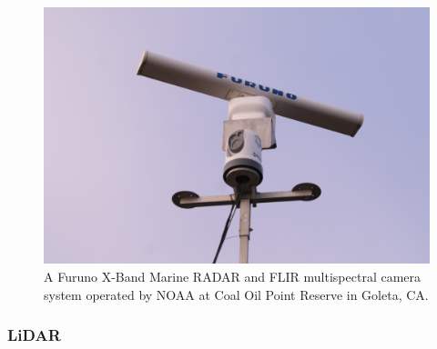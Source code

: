 \documentclass{article}
\begin{document}
\begin{figure}
    \centering
    \includegraphics[width=1\linewidth]{images/furuno-x-band-radar.JPG}
    \caption{A Furuno X-Band Marine RADAR and FLIR multispectral camera system operated by NOAA at Coal Oil Point Reserve in Goleta, CA.}
    \label{figure20}
\end{figure}

\subsubsection{LiDAR}

\end{document}
